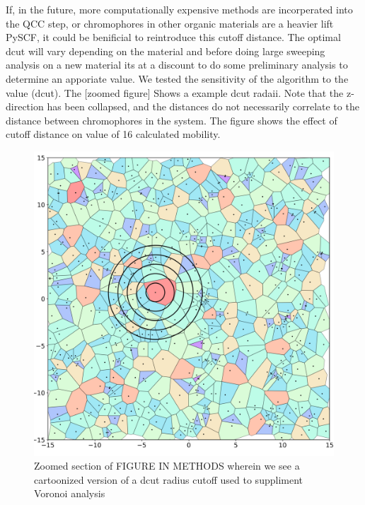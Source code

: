 If, in the future, more computationally expensive methods are incorperated into the QCC step, or chromophores in other
organic materials are a heavier lift PySCF, it could be benificial to reintroduce this cutoff distance. The optimal dcut will vary depending on the material and before doing large sweeping analysis on a new
material its at a discount to do some preliminary analysis to determine an apporiate value. We tested the
sensitivity of the algorithm to the value (dcut). The [zoomed figure] Shows a example dcut radaii. Note that
the z-direction has been collapsed, and the distances do not necessarily correlate to the distance
between chromophores in the system. The figure shows the effect of cutoff distance on value of
16 calculated mobility.


\begin{figure}
  \center
  \includegraphics[width=\linewidth]{figures/crystalline_voronoi_d_cut_circles.png} 
  \caption{Zoomed section of FIGURE IN METHODS wherein we see a cartoonized version of a dcut radius cutoff
    used to suppliment Voronoi analysis}
  \label{fig:dcut}
\end{figure}


